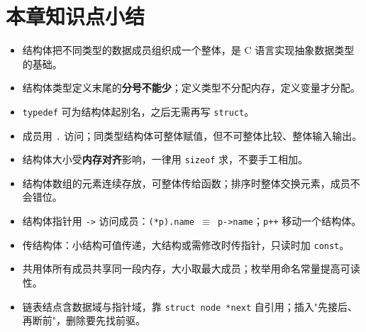 \section{本章知识点小结}
\begin{itemize}
  \item 结构体把不同类型的数据成员组织成一个整体，是 C 语言实现抽象数据类型的基础。
  \item 结构体类型定义末尾的\textbf{分号不能少}；定义类型不分配内存，定义变量才分配。
  \item \texttt{typedef} 可为结构体起别名，之后无需再写 \texttt{struct}。
  \item 成员用 \texttt{.} 访问；同类型结构体可整体赋值，但不可整体比较、整体输入输出。
  \item 结构体大小受\textbf{内存对齐}影响，一律用 \texttt{sizeof} 求，不要手工相加。
  \item 结构体数组的元素连续存放，可整体传给函数；排序时整体交换元素，成员不会错位。
  \item 结构体指针用 \texttt{->} 访问成员：\texttt{(*p).name $\equiv$ p->name}；\texttt{p++} 移动一个结构体。
  \item 传结构体：小结构可值传递，大结构或需修改时传指针，只读时加 \texttt{const}。
  \item 共用体所有成员共享同一段内存，大小取最大成员；枚举用命名常量提高可读性。
  \item 链表结点含数据域与指针域，靠 \texttt{struct node *next} 自引用；插入"先接后、再断前"，删除要先找前驱。
\end{itemize}

